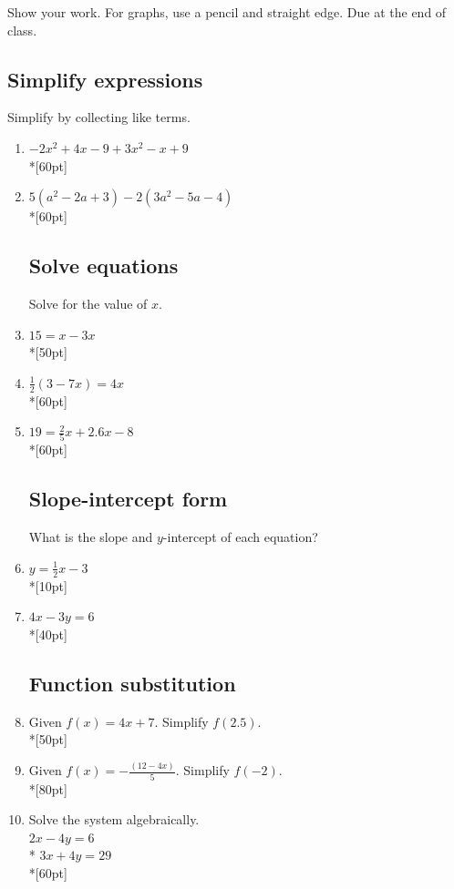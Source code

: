 \documentclass[12pt, oneside]{article}
\begin{document}
Show your work. For graphs, use a pencil and straight edge. Due at the end of class.

\subsection*{Simplify expressions}

Simplify by collecting like terms.

\begin{enumerate}

\item $-2x^2+4x -9 +3x^2-x+9$\\*[60pt]
\item $5(a^2-2a +3) -2(3a^2-5a-4)$\\*[60pt]

\subsection*{Solve equations}

Solve for the value of $x$.
\item   $15=x-3x$\\*[50pt]
\item   $\frac{1}{2}(3-7x)=4x$\\*[60pt]
\item   $19=\frac{2}{5}x+2.6x-8$\\*[60pt]

\newpage
\subsection*{Slope-intercept form}

What is the slope and $y$-intercept of each equation? 
\item   $y=\frac{1}{2}x-3$\\*[10pt]
\item   $4x-3y=6$\\*[40pt]


\subsection*{Function substitution}
\item Given $f(x)=4x+7$. Simplify $f(2.5)$.\\*[50pt]
\item Given $\displaystyle f(x)=-\frac{(12-4x)}{5}$. Simplify $f(-2)$.\\*[80pt]

\item Solve the system algebraically.\\
$2x-4y=6$\\*
$3x+4y=29$\\*[60pt]



\end{enumerate}
\end{document}
